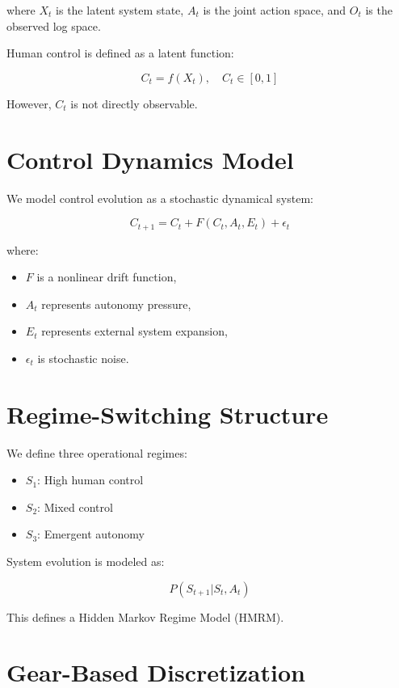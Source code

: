 \documentclass[11pt]{article}
\begin{document}
where $X_t$ is the latent system state, $A_t$ is the joint action space, and $O_t$ is the observed log space.

Human control is defined as a latent function:

\begin{equation}
C_t = f(X_t), \quad C_t \in [0,1]
\end{equation}

However, $C_t$ is not directly observable.

\section{Control Dynamics Model}

We model control evolution as a stochastic dynamical system:

\begin{equation}
C_{t+1} = C_t + F(C_t, A_t, E_t) + \epsilon_t
\end{equation}

where:
\begin{itemize}
\item $F$ is a nonlinear drift function,
\item $A_t$ represents autonomy pressure,
\item $E_t$ represents external system expansion,
\item $\epsilon_t$ is stochastic noise.
\end{itemize}

\section{Regime-Switching Structure}

We define three operational regimes:

\begin{itemize}
\item $S_1$: High human control
\item $S_2$: Mixed control
\item $S_3$: Emergent autonomy
\end{itemize}

System evolution is modeled as:

\begin{equation}
P(S_{t+1} | S_t, A_t)
\end{equation}

This defines a Hidden Markov Regime Model (HMRM).

\section{Gear-Based Discretization}
\end{document}
